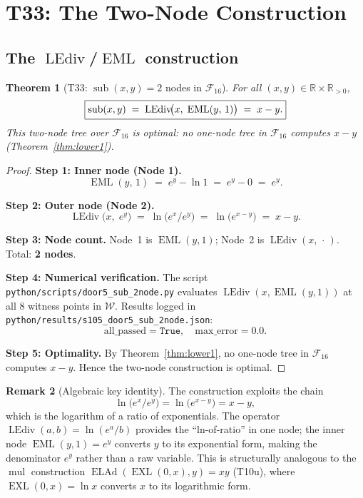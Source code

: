 \documentclass[12pt,a4paper]{article}
\newtheorem{theorem}{Theorem}[section]
\theoremstyle{definition}
\newtheorem{remark}[theorem]{Remark}
\newcommand{\EML}{\operatorname{EML}}
\newcommand{\EXL}{\operatorname{EXL}}
\newcommand{\ELAd}{\operatorname{ELAd}}
\newcommand{\LEdiv}{\operatorname{LEdiv}}
\newcommand{\sub}{\operatorname{sub}}
\newcommand{\mul}{\operatorname{mul}}
\begin{document}
\section{T33: The Two-Node Construction}

\subsection{The $\LEdiv$/$\EML$ construction}

\begin{theorem}[T33: $\sub(x,y) = 2$ nodes in $\mathcal{F}_{16}$]\label{thm:T33}
For all $(x,y)\in\mathbb{R}\times\mathbb{R}_{>0}$,
\[
  \boxed{%
    \sub(x,y) \;=\; \LEdiv\!\bigl(x,\;\EML(y,\,1)\bigr) \;=\; x - y.
  }
\]
This two-node tree over $\mathcal{F}_{16}$ is \emph{optimal}: no one-node
tree in $\mathcal{F}_{16}$ computes $x-y$ (Theorem~\ref{thm:lower1}).
\end{theorem}

\begin{proof}
\noindent\textbf{Step 1: Inner node (Node 1).}
\[
  \EML(y,\,1) \;=\; e^{y} - \ln 1 \;=\; e^{y} - 0 \;=\; e^{y}.
\]

\noindent\textbf{Step 2: Outer node (Node 2).}
\[
  \LEdiv\!\bigl(x,\;e^{y}\bigr)
  \;=\; \ln\!\bigl(e^{x} / e^{y}\bigr)
  \;=\; \ln\!\bigl(e^{x-y}\bigr)
  \;=\; x - y.
\]

\noindent\textbf{Step 3: Node count.}
Node~1 is $\EML(y,1)$; Node~2 is $\LEdiv(x,\,\cdot\,)$.
Total: \textbf{2 nodes}.

\noindent\textbf{Step 4: Numerical verification.}
The script \texttt{python/scripts/door5\_sub\_2node.py} evaluates
$\LEdiv(x, \EML(y,1))$ at all 8 witness points in $\mathcal{W}$.
Results logged in \texttt{python/results/s105\_door5\_sub\_2node.json}:
\[
  \text{all\_passed} = \texttt{True},\quad \text{max\_error} = 0.0.
\]

\noindent\textbf{Step 5: Optimality.}
By Theorem~\ref{thm:lower1}, no one-node tree in $\mathcal{F}_{16}$ computes
$x-y$.  Hence the two-node construction is optimal.
\end{proof}

\begin{remark}[Algebraic key identity]\label{rem:key}
The construction exploits the chain
\[
  \ln\!\bigl(e^x / e^y\bigr) = \ln\!\bigl(e^{x-y}\bigr) = x - y,
\]
which is the logarithm of a ratio of exponentials.
The operator $\LEdiv(a,b) = \ln(e^a/b)$ provides the ``ln-of-ratio'' in one
node; the inner node $\EML(y,1)=e^y$ converts $y$ to its exponential form,
making the denominator $e^y$ rather than a raw variable.
This is structurally analogous to the $\mul$ construction
$\ELAd(\EXL(0,x),y) = xy$ (T10u), where $\EXL(0,x) = \ln x$ converts $x$
to its logarithmic form.
\end{remark}
\end{document}
